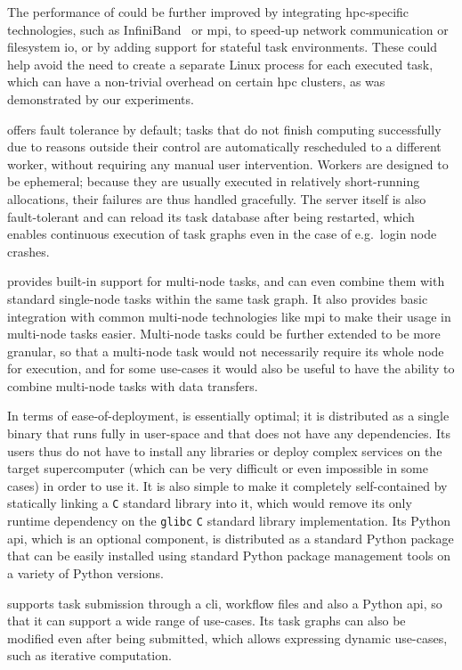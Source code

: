 \begin{description}[wide=0pt]
		The performance of \hyperqueue{} could be further improved by integrating
		\gls{hpc}-specific technologies, such as InfiniBand~\cite{infiniband} or
		\gls{mpi}, to speed-up network communication or filesystem
		\gls{io}, or by adding support for stateful task environments. These could help
		avoid the need to create a separate Linux process for each executed task, which can have a
		non-trivial overhead on certain \gls{hpc} clusters, as was demonstrated by our
		experiments.
	\item[Fault tolerance] \hyperqueue{} offers fault tolerance by default; tasks that do not
		finish computing successfully due to reasons outside their control are automatically rescheduled to
		a different worker, without requiring any manual user intervention. Workers are designed to be
		ephemeral; because they are usually executed in relatively short-running allocations, their
		failures are thus handled gracefully. The server itself is also fault-tolerant and can reload its
		task database after being restarted, which enables continuous execution of task graphs even in the
		case of e.g.\ login node crashes.
	\item[Multi-node tasks] \hyperqueue{} provides built-in support for multi-node tasks, and
		can even combine them with standard single-node tasks within the same task graph. It also provides
		basic integration with common multi-node technologies like \gls{mpi} to make their
		usage in multi-node tasks easier. Multi-node tasks could be further extended to be more granular,
		so that a multi-node task would not necessarily require its whole node for execution, and for some
		use-cases it would also be useful to have the ability to combine multi-node tasks with data
		transfers.
	\item[Deployment] In terms of ease-of-deployment, \hyperqueue{} is essentially optimal; it is
		distributed as a single binary that runs fully in user-space and that does not have any
		dependencies. Its users thus do not have to install any libraries or deploy complex services on the
		target supercomputer (which can be very difficult or even impossible in some cases) in order to use
		it. It is also simple to make it completely self-contained by statically linking a
		\texttt{C} standard library into it, which would remove its only runtime dependency
		on the \texttt{glibc} \texttt{C} standard library implementation. Its Python
		\gls{api}, which is an optional component, is distributed as a standard Python
		package that can be easily installed using standard Python package management tools on a variety
		of Python versions.
	\item[Programming model] \hyperqueue{} supports task submission through a \gls{cli},
		workflow files and also a Python \gls{api}, so that it can support a wide range of
		use-cases. Its task graphs can also be modified even after being submitted, which allows expressing
		dynamic use-cases, such as iterative computation.


\end{description}
